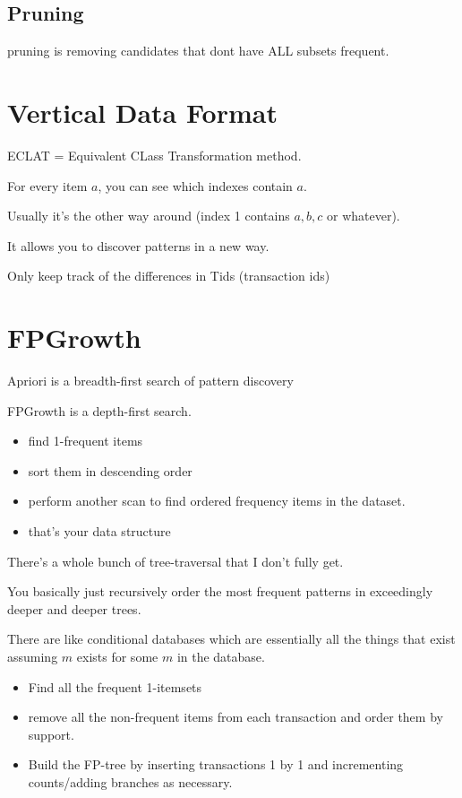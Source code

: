\documentclass[fleqn]{report}
\begin{document}
\subsection{Pruning}

pruning is removing candidates that dont have ALL 
subsets frequent.

\section{Vertical Data Format}
ECLAT = Equivalent CLass Transformation method.


For every item $a$, you can see which indexes contain $a$. 

Usually it's the other way around (index 1 contains $a, b, c$ or whatever).

It allows you to discover patterns in a new way. 

Only keep track of the differences in Tids (transaction ids)

\section{FPGrowth}
Apriori is a breadth-first search of pattern discovery 

FPGrowth is a depth-first search. 

\begin{itemize}
    \item 
    find 1-frequent items 
    \item 
    sort them in descending order 
    \item 
    perform another scan to find ordered frequency items in the dataset. 
    \item 
    that's your data structure 
\end{itemize}

There's a whole bunch of tree-traversal that I don't fully get. 

You basically just recursively order the most frequent patterns in 
exceedingly deeper and deeper trees. 

There are like conditional databases which are essentially all the 
things that exist assuming $m$ exists for some $m$ in the database. 

\begin{itemize}
    \item
    Find all the frequent 1-itemsets 
    \item 
    remove all the non-frequent items from each transaction 
    and order them by support.
    \item 
    Build the FP-tree by inserting transactions 1 by 1 
    and incrementing counts/adding branches as necessary.
\end{itemize}
\end{document}
